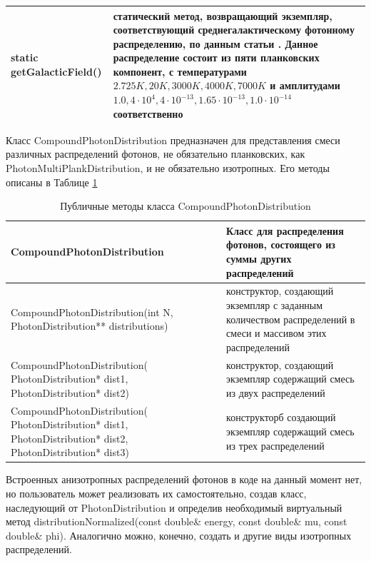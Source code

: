 \begin{table}
\begin{center}
\begin{small}
\begin{tabularx}{\textwidth}{|X|X|}
				\hline
				static getGalacticField() & статический метод, возвращающий экземпляр, соответствующий среднегалактическому фотонному распределению, по данным статьи \cite{Mathis1983}. Данное распределение состоит из пяти планковских компонент, с температурами $2.725K, 20K, 3000K, 4000K, 7000K$ и амплитудами $1.0, 4\cdot10^{4}, 4\cdot10^{-13}, 1.65\cdot10^{-13}, 1.0\cdot10^{-14}$ соответственно\\
				\hline
			\end{tabularx}
		\end{small}
	\end{center}
\end{table}

Класс CompoundPhotonDistribution предназначен для представления смеси различных распределений фотонов, не обязательно планковских, как PhotonMultiPlankDistribution, и не обязательно изотропных. Его методы описаны в Таблице \ref{CompoundPhotonMethods}

\begin{table}
	\begin{center}
		\caption{Публичные методы класса CompoundPhotonDistribution }
		\label{CompoundPhotonMethods}
		\begin{small}
			\begin{tabularx}{\textwidth}{|X|X|}
				\hline
				\textbf{CompoundPhotonDistribution} & Класс для распределения фотонов, состоящего из суммы других распределений\\
				\hline
				CompoundPhotonDistribution(int N, PhotonDistribution** distributions) & конструктор, создающий экземпляр с заданным количеством распределений в смеси и массивом этих распределений \\
				\hline
				CompoundPhotonDistribution( PhotonDistribution* dist1, PhotonDistribution* dist2) & конструктор, создающий экземпляр содержащий смесь из двух распределений\\
				\hline
				CompoundPhotonDistribution( PhotonDistribution* dist1, PhotonDistribution* dist2, PhotonDistribution* dist3) & конструкторб создающий экземпляр содержащий смесь из трех распределений\\
				\hline
			\end{tabularx}
		\end{small}
	\end{center}
\end{table}

Встроенных анизотропных распределений фотонов в коде на данный момент нет, но пользователь может реализовать их самостоятельно, создав класс, наследующий от PhotonDistribution и определив необходимый виртуальный метод distributionNormalized(const double\& energy, const double\& mu, const double\& phi). Аналогично можно, конечно, создать и другие виды изотропных распределений.


